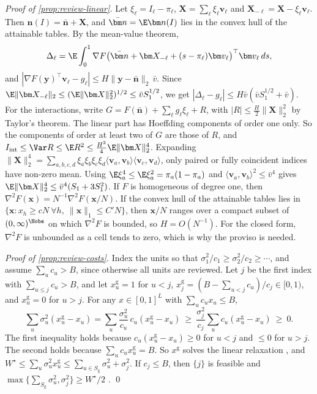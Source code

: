\emph{Proof of \cref{prop:review-linear}.} Let $\xi_\ell=I_\ell-\pi_\ell$, $\bm X=\sum_\ell\xi_\ell\bm v_\ell$ and $\bm X_{-\ell}=\bm X-\xi_\ell\bm v_\ell$. Then $\bm n(I)=\bar{\bm n}+\bm X$, and $\bar{\bm n}=\E\bm n(I)$ lies in the convex hull of the attainable tables. By the mean-value theorem,
\[
  \Delta_\ell=\E\int_0^1\nabla F\bigl(\bar{\bm n}+\bm X_{-\ell}+(s-\pi_\ell)\bm v_\ell\bigr)^{\top}\bm v_\ell\,ds ,
\]
and $|\nabla F(\bm y)^{\top}\bm v_\ell-g_\ell|\le H\|\bm y-\bar{\bm n}\|_2\,\bar v$. Since $\E\|\bm X_{-\ell}\|_2\le(\E\|\bm X\|_2^2)^{1/2}\le\bar vS_1^{1/2}$, we get $|\Delta_\ell-g_\ell|\le H\bar v(\bar vS_1^{1/2}+\bar v)$. For the interactions, write $G=F(\bar{\bm n})+\sum_\ell g_\ell\xi_\ell+R$, with $|R|\le\frac H2\|\bm X\|_2^2$ by Taylor's theorem. The linear part has Hoeffding components of order one only. So the components of order at least two of $G$ are those of $R$, and $I_{\mathrm{int}}\le\Var R\le\E R^2\le\frac{H^2}4\E\|\bm X\|_2^4$. Expanding $\|\bm X\|_2^4=\sum_{a,b,c,d}\xi_a\xi_b\xi_c\xi_d\langle\bm v_a,\bm v_b\rangle\langle\bm v_c,\bm v_d\rangle$, only paired or fully coincident indices have non-zero mean. Using $\E\xi_a^4\le\E\xi_a^2=\pi_a(1-\pi_a)$ and $\langle\bm v_a,\bm v_b\rangle^2\le\bar v^4$ gives $\E\|\bm X\|_2^4\le\bar v^4(S_1+3S_1^2)$. If $F$ is homogeneous of degree one, then $\nabla^2F(\bm x)=N^{-1}\nabla^2F(\bm x/N)$. If the convex hull of the attainable tables lies in $\{\bm x:x_h\ge cN\ \forall h,\ \|\bm x\|_1\le C'N\}$, then $\bm x/N$ ranges over a compact subset of $(0,\infty)^{\Hobs}$ on which $\nabla^2F$ is bounded, so $H=O(N^{-1})$. For the closed form, $\nabla^2F$ is unbounded as a cell tends to zero, which is why the proviso is needed.

\emph{Proof of \cref{prop:review-costs}.} Index the units so that $\sigma_1^2/c_1\ge\sigma_2^2/c_2\ge\cdots$, and assume $\sum_uc_u>B$, since otherwise all units are reviewed. Let $j$ be the first index with $\sum_{u\le j}c_u>B$, and let $x^{\mathrm g}_u=1$ for $u<j$, $x^{\mathrm g}_j=(B-\sum_{u<j}c_u)/c_j\in[0,1)$, and $x^{\mathrm g}_u=0$ for $u>j$. For any $x\in[0,1]^L$ with $\sum_uc_ux_u\le B$,
\[
  \sum_u\sigma_u^2(x^{\mathrm g}_u-x_u)=\sum_u\frac{\sigma_u^2}{c_u}\,c_u(x^{\mathrm g}_u-x_u)\ \ge\ \frac{\sigma_j^2}{c_j}\sum_uc_u(x^{\mathrm g}_u-x_u)\ \ge\ 0 .
\]
The first inequality holds because $c_u(x^{\mathrm g}_u-x_u)\ge0$ for $u<j$ and $\le0$ for $u>j$. The second holds because $\sum_uc_ux^{\mathrm g}_u=B$. So $x^{\mathrm g}$ solves the linear relaxation \citep{dantzig1957}, and $W^\star\le\sum_u\sigma_u^2x^{\mathrm g}_u\le\sum_{u\in S_{\mathrm g}}\sigma_u^2+\sigma_j^2$. If $c_j\le B$, then $\{j\}$ is feasible and $\max\{\sum_{S_{\mathrm g}}\sigma_u^2,\sigma_j^2\}\ge W^\star/2$ \citep{kellerer2004}. \qed

